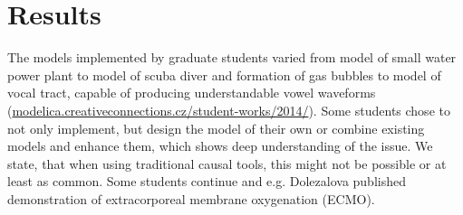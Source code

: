 \documentclass[letterpaper, 10 pt, conference]{ieeeconf}  %
\begin{document}

%
%



\section{Results}
The models implemented by graduate students varied from model of small water power plant to model of scuba diver and formation of gas bubbles to model of vocal tract, capable of producing understandable vowel waveforms (\url{modelica.creativeconnections.cz/student-works/2014/}). Some students chose to not only implement, but design the model of their own or combine existing models and enhance them, which shows deep understanding of the issue. We state, that when using traditional causal tools, this might not be possible or at least as common. Some students continue and e.g. Dolezalova published demonstration of extracorporeal membrane oxygenation (ECMO)\cite{dolezalova2014}.
\end{document}
